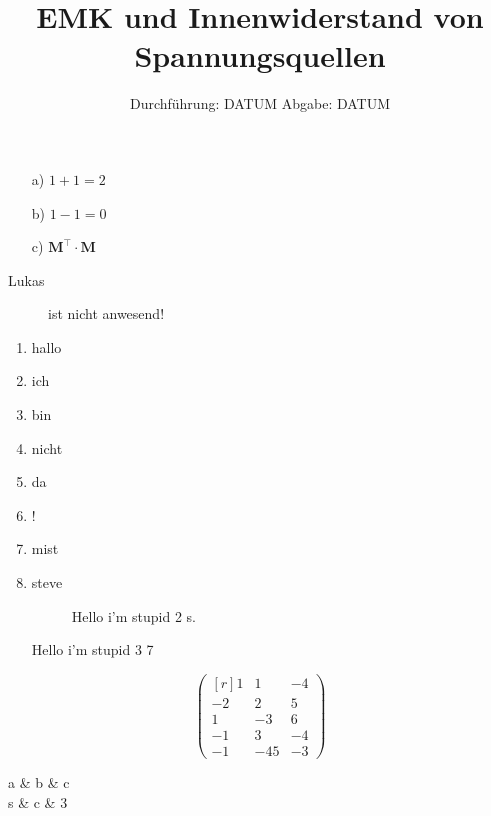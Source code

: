 

\subject{V301}
\title{EMK und Innenwiderstand von Spannungsquellen}
\date{
	Durchführung: DATUM
	\hspace{4em}
	Abgabe: DATUM
}


	\maketitle
	\newpage
	\tableofcontents
	\newpage
	\newpage
	
	
	
	\begin{itemize}
		\item[a)] $1+1=2$
		\item[b)] $1-1=0$
		\item[c)] $\symbf{M}^\top \cdot \symbf{M}$
	\end{itemize}
	\begin{description}
		\item[Lukas] ist nicht anwesend!
	\end{description}
	\begin{enumerate}
		\item hallo
		\item ich 
		\item bin
		\item nicht
		\item da
		\item !
		\item mist
		\item steve
		\begin{figure}
			Hello i'm stupid 2 s.~\cite{wingate}
		\end{figure}
		Hello i'm stupid 3 7
	\end{enumerate}
	\begin{displaymath}
		\begin{pmatrix*}[r]
		1 & 1 & -4 \\
		-2 & 2 & 5\\
		1 & -3 & 6 \\
		-1 & 3 & -4 \\
		-1 & -45 & -3
		\end{pmatrix}
	\end{displaymath}
	\begin{table}
		a & b & c \\
		s & c & 3
	\end{table}
